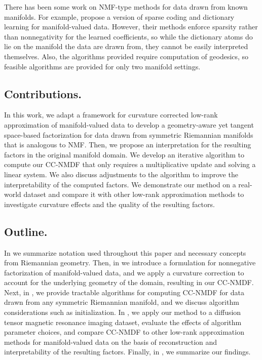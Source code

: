 There has been some work on NMF-type methods for data drawn from known manifolds. For example, \cite{ho2013nonlinear} propose a version of sparse coding and dictionary learning for manifold-valued data. However, their methods enforce sparsity rather than nonnegativity for the learned coefficients, so while the dictionary atoms do lie on the manifold the data are drawn from, they cannot be easily interpreted themselves. Also, the algorithms provided require computation of geodesics, so feasible algorithms are provided for only two manifold settings. 

\subsection{Contributions.}
In this work, we adapt a framework for curvature corrected low-rank approximation of manifold-valued data \citep{diepeveen2023curvature} to develop a geometry-aware yet tangent space-based factorization for data drawn from symmetric Riemannian manifolds that is analogous to NMF. Then, we propose an interpretation for the resulting factors in the original manifold domain. We develop an iterative algorithm to compute our CC-NMDF that only requires a multiplicative update and solving a linear system. We also discuss adjustments to the algorithm to improve the interpretability of the computed factors. We demonstrate our method on a real-world dataset and compare it with other low-rank approximation methods to investigate curvature effects and the quality of the resulting factors. 

\subsection{Outline.}
In  we summarize notation used throughout this paper and necessary concepts from Riemannian geometry. Then, in  we introduce a formulation for nonnegative factorization of manifold-valued data, and we apply a curvature correction to account for the underlying geometry of the domain, resulting in our CC-NMDF. Next, in , we provide tractable algorithms for computing CC-NMDF for data drawn from any symmetric Riemannian manifold, and we discuss algorithm considerations such as initialization. In , we apply our method to a diffusion tensor magnetic resonance imaging dataset, evaluate the effects of algorithm parameter choices, and compare CC-NMDF to other low-rank approximation methods for manifold-valued data on the basis of reconstruction and interpretability of the resulting factors. Finally, in , we summarize our findings. 


